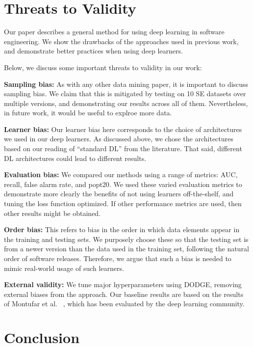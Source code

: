 \documentclass[10pt,compsoc,twocolumn]{IEEEtran}
\begin{document}
\section{Threats to Validity}
\label{sec:threats}

Our paper describes a general method for using deep learning in software engineering. We show the drawbacks of the approaches used in previous work, and demonstrate better practices when using deep learners.

Below, we discuss some important threats to validity in our work:

\textbf{Sampling bias:} As with any other data mining paper, it is important to discuss sampling bias. We claim that this is mitigated by testing on 10 SE datasets over multiple versions, and demonstrating our results across all of them. Nevertheless, in future work, it would be useful to explroe more data. 

\textbf{Learner bias:} Our learner bias here corresponds to the choice of architectures we used in our deep learners. As discussed above, we chose the architectures based on our reading of ``standard DL'' from the literature. That said, different DL architectures could lead to different results.

\textbf{Evaluation bias:} We compared our methods using a range of   metrics: AUC, recall, false alarm rate, and popt20. We used these  varied evaluation metrics to demonstrate more clearly the benefits of not using learners off-the-shelf, and tuning the loss function optimized. If other performance metrics are used, then other results might be obtained.

\textbf{Order bias:} This refers to bias in the order in which data elements appear in the training and testing sets. We purposely choose these so that the testing set is from a newer version than the data used in the training set, following the natural order of software releases. Therefore, we argue that such a bias is needed to mimic real-world usage of such learners.

\textbf{External validity:} We tune major hyperparameters using DODGE, removing external biases from the approach. Our baseline results are based on the results of Montufar et al. ~\cite{montufar2014number}, which has been evaluated by the deep learning community.

\section{Conclusion}
\label{sec:conclusion}
\end{document}
